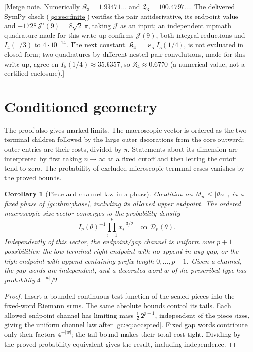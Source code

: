 \documentclass[11pt,a4paper]{article}
\newtheorem{corollary}[corollary]{Corollary}
\theoremstyle{definition}\newaliascnt{definition}{theorem}
\theoremstyle{remark}\newaliascnt{remark}{theorem}
\begin{document}
[Merge note. Numerically $\mathfrak K_3=1.99471\ldots$ and
$\mathfrak L_3=100.4797\ldots$. The delivered SymPy check
(\cref{gc:sec:finite}) verifies the pair antiderivative, its endpoint value and
$-1728\,\mathcal J'(9)=8\sqrt2\,\pi$, taking $\mathcal J$ as an input; an
independent mpmath quadrature made for this write-up confirms $\mathcal J(9)$,
both integral reductions and $I_4(1/3)$ to $4\cdot10^{-14}$. The next constant,
$\mathfrak K_4=\varkappa_5I_5(1/4)$, is not evaluated in closed form; two quadratures by different nested pair
convolutions, made for this write-up, agree on $I_5(1/4)\approx35.6357$, so
$\mathfrak K_4\approx0.6770$ (a numerical value, not a certified
enclosure).]

\section{Conditioned geometry}
\label{gc:sec:geometry}
The proof also gives marked limits. The macroscopic vector is ordered as the
two terminal children followed by the large outer decorations from the core
outward; outer entries are their costs, divided by $n$. Statements about its
dimension are interpreted by first taking $n\to\infty$ at a fixed cutoff and
then letting the cutoff tend to zero. The probability of excluded microscopic
terminal cases vanishes by the proved bounds.

\begin{corollary}[Piece and channel law in a phase]\label{gc:cor:geometry}
Condition on $M_n\le\lfloor\theta n\rfloor$, in a fixed phase of
\cref{gc:thm:phase}, including its allowed upper endpoint. The ordered
macroscopic-size vector converges to the probability density
\[
 I_p(\theta)^{-1}\prod_{i=1}^p x_i^{-3/2}
 \quad\text{on }\mathcal D_p(\theta).
\]
Independently of this vector, the endpoint/gap channel is uniform over $p+1$
possibilities: the low terminal-right endpoint with no append in any gap, or
the high endpoint with append-containing prefix length $0,\ldots,p-1$. Given a
channel, the gap words are independent, and a decorated word $w$ of the
prescribed type has probability $4^{-|w|}/2$.
\end{corollary}
\begin{proof}
Insert a bounded continuous test function of the scaled pieces into the
fixed-word Riemann sums. The same absolute bounds control its tails. Each
allowed endpoint channel has limiting mass $\tfrac12\,2^{p-1}$, independent of
the piece sizes, giving the uniform channel law after \eqref{gc:eq:accepted}.
Fixed gap words contribute only their factors $4^{-|w|}$; the tail bound makes
their total cost tight. Dividing by the proved probability equivalent gives the
result, including independence.
\end{proof}
\end{document}
